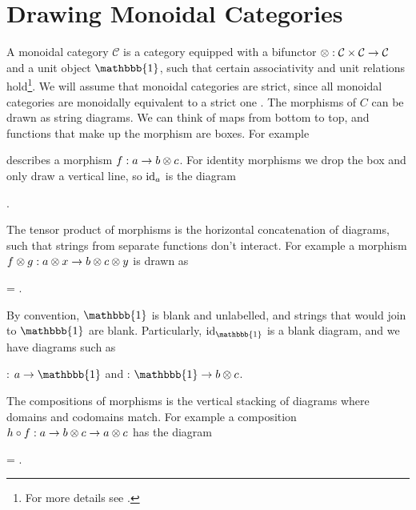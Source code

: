 \section{Drawing Monoidal Categories}

A monoidal category $\mathcal{C}$ is a category equipped with a bifunctor $\otimes: \mathcal{C} \times \mathcal{C} \to \mathcal{C}$ and a unit object $\mathbbb{1}$, such that certain associativity and unit relations hold\footnote{For more details see \cite{tensor-categories}.}. We will assume that monoidal categories are strict, since all monoidal categories are monoidally equivalent to a strict one \red{[Reference?]}. The morphisms of $C$ can be drawn as string diagrams. We can think of maps from bottom to top, and functions that make up the morphism are boxes. For example
\begin{center}
\end{center}
describes a morphism $f: a \to b \otimes c$. For identity morphisms we drop the box and only draw a vertical line, so $\operatorname{id}_a$ is the diagram
\begin{center}
    .
\end{center}
The tensor product of morphisms is the horizontal concatenation of diagrams, such that strings from separate functions don't interact. For example a morphism $f \otimes g: a \otimes x \to b \otimes c \otimes y$ is drawn as
\begin{center}
    = 
    .
\end{center}
By convention, $\mathbbb{1}$ is blank and unlabelled, and strings that would join to $\mathbbb{1}$ are blank. Particularly, $\id_\mathbbb{1}$ is a blank diagram, and we have diagrams such as
\begin{center}
    : $a \to \mathbbb{1}$
    \quad and \quad
    : $\mathbbb{1} \to b \tensor c$.
\end{center}
The compositions of morphisms is the vertical stacking of diagrams where domains and codomains match. For example a composition $h \circ f: a \to b \otimes c \to a \otimes c$ has the diagram
\begin{center}
    =
    .
\end{center}







